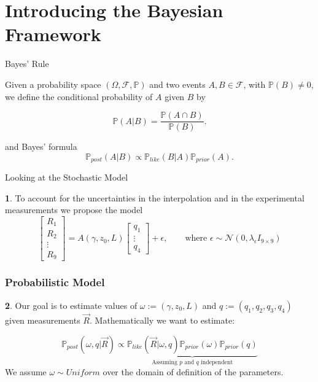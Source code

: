 \documentclass[11pt]{beamer}
\theoremstyle{plain}
\theoremstyle{definition}
\newtheorem{dfn}{}[section]
\newcommand{\p}{\mathbb{P}}
\newcommand{\like}{\p_{like}}
\newcommand{\prior}{\p_{prior}}
\newcommand{\post}{\p_{post}}
\begin{document}
\section{Introducing the Bayesian Framework}

\begin{frame}{Bayes' Rule}

Given a probability space $(\Omega,\mathscr{F},\p)$ and two events $A,B\in\mathscr{F}$, with $\p(B)\neq 0$,
we define the conditional probability of $A$ given $B$ by

\begin{equation*}
\p(A|B)=\frac{\p(A\cap B)}{\p(B)}.
\end{equation*}


and Bayes' formula 
\begin{equation}\label{eqnBayes}
\post(A|B)\propto\like(B|A)\prior(A).
\end{equation}

\end{frame}



\begin{frame}{Looking at the Stochastic Model}
\begin{dfn}
To account for the uncertainties in the interpolation and in the experimental measurements we propose the model
\begin{equation*}
\begin{bmatrix}
R_{1} \\
R_{2} \\
\vdots\\
R_{9}
\end{bmatrix}=A(\gamma,z_{0},L)
\begin{bmatrix}
q_{1}\\
\vdots\\
q_{4}
\end{bmatrix}+\epsilon,\qquad\text{where }\epsilon\sim \mathcal{N}(0,\lambda_{\epsilon} I_{9\times 9})
\end{equation*}
\end{dfn}
\end{frame}


\begin{frame}
\frametitle{Probabilistic Model}

\begin{dfn}
Our goal is to estimate  values of $\omega:=(\gamma,z_{0},L)$ and 
$q:=(q_{1},q_{2},q_{3},q_{4})$ given  measurements
$\vec{R}$. Mathematically we want to estimate:

\begin{equation*}
\post(\omega,q|\vec{R})\propto
\underbrace{\like(\vec{R}|\omega,q)\prior(\omega)\prior(q)}_{\text{Assuming $p$ and $q$ independent}}
\end{equation*}
We assume $\omega\sim Uniform$ over the domain of definition of the parameters.
 
\end{dfn}
\end{frame}
\end{document}
